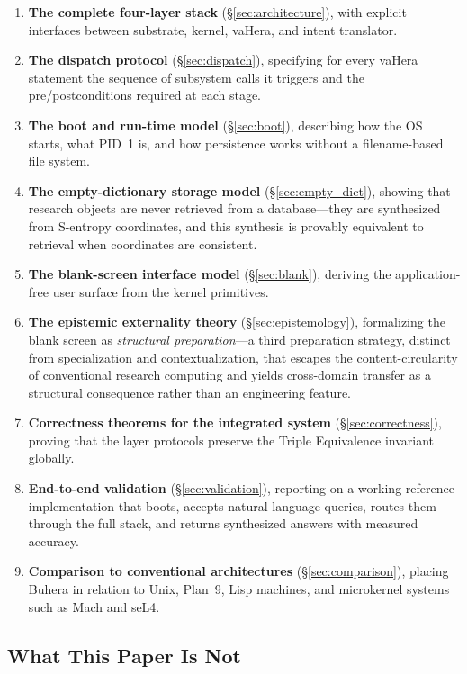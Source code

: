 \documentclass[11pt,twocolumn,a4paper]{article}
\begin{document}
\begin{enumerate}[leftmargin=*]
\item \textbf{The complete four-layer stack} (\S\ref{sec:architecture}), with explicit interfaces between substrate, kernel, vaHera, and intent translator.
\item \textbf{The dispatch protocol} (\S\ref{sec:dispatch}), specifying for every vaHera statement the sequence of subsystem calls it triggers and the pre/postconditions required at each stage.
\item \textbf{The boot and run-time model} (\S\ref{sec:boot}), describing how the OS starts, what PID~1 is, and how persistence works without a filename-based file system.
\item \textbf{The empty-dictionary storage model} (\S\ref{sec:empty_dict}), showing that research objects are never retrieved from a database---they are synthesized from S-entropy coordinates, and this synthesis is provably equivalent to retrieval when coordinates are consistent.
\item \textbf{The blank-screen interface model} (\S\ref{sec:blank}), deriving the application-free user surface from the kernel primitives.
\item \textbf{The epistemic externality theory} (\S\ref{sec:epistemology}), formalizing the blank screen as \emph{structural preparation}---a third preparation strategy, distinct from specialization and contextualization, that escapes the content-circularity of conventional research computing and yields cross-domain transfer as a structural consequence rather than an engineering feature.
\item \textbf{Correctness theorems for the integrated system} (\S\ref{sec:correctness}), proving that the layer protocols preserve the Triple Equivalence invariant globally.
\item \textbf{End-to-end validation} (\S\ref{sec:validation}), reporting on a working reference implementation that boots, accepts natural-language queries, routes them through the full stack, and returns synthesized answers with measured accuracy.
\item \textbf{Comparison to conventional architectures} (\S\ref{sec:comparison}), placing Buhera in relation to Unix, Plan~9, Lisp machines, and microkernel systems such as Mach and seL4.
\end{enumerate}

\subsection{What This Paper Is Not}
\end{document}
